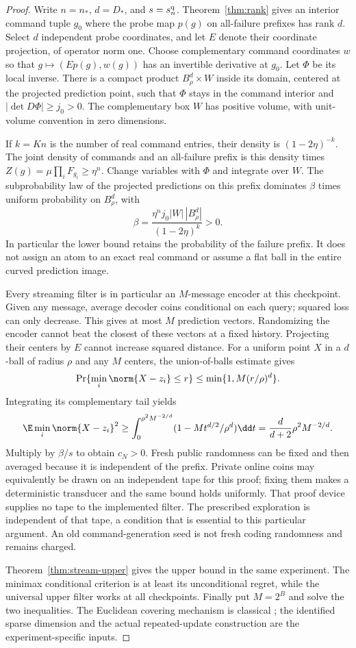\begin{proof}
Write $n=n_*$, $d=D_*$, and $s=s_n^{\rm q}$. Theorem~\ref{thm:rank}
gives an interior command tuple $g_0$ where the probe map $p(g)$ on
all-failure prefixes has rank $d$. Select $d$ independent probe coordinates,
and let $E$ denote their coordinate projection, of operator norm one.
Choose complementary command coordinates $w$ so that
$g\mapsto(Ep(g),w(g))$ has an invertible derivative at $g_0$.
Let $\Phi$ be its local inverse. There is a compact product
$B_\rho^d\times W$ inside its domain, centered at the projected
prediction point, such that $\Phi$ stays in the command interior and
$|\det D\Phi|\ge j_0>0$. The complementary box $W$ has positive
volume, with unit-volume convention in zero dimensions.

If $k=Kn$ is the number of real command entries, their density is
$(1-2\eta)^{-k}$. The joint density of commands and an all-failure
prefix is this density times
$Z(g)=\mu\prod_iF_{g_i}\ge\eta^n$. Change variables with $\Phi$ and
integrate over $W$. The subprobability law of the projected predictions
on this prefix dominates $\beta$ times uniform probability on
$B_\rho^d$, with
\[
 \beta=\frac{\eta^n j_0|W|\,|B_\rho^d|}{(1-2\eta)^k}>0.
\]
In particular the lower bound retains the probability of the failure
prefix. It does not assign an atom to an exact real command or assume
a flat ball in the entire curved prediction image.

Every streaming filter is in particular an $M$-message encoder at this
checkpoint. Given any message, average decoder coins conditional on each
query; squared loss can only decrease. This gives at most $M$ prediction
vectors. Randomizing the encoder cannot beat the closest of these vectors
at a fixed history. Projecting their centers by $E$ cannot increase squared
distance. For a uniform point $X$ in a $d$-ball of radius $\rho$ and any
$M$ centers, the union-of-balls estimate gives
\[
 \Pr\{\min_i\norm{X-z_i}\le r\}\le
                    \min\{1,M(r/\rho)^d\}.
\]
Integrating its complementary tail yields
\[
 \E\min_i\norm{X-z_i}^2
 \ge\int_0^{\rho^2 M^{-2/d}}
          (1-Mt^{d/2}/\rho^d)\dd t
 =\frac d{d+2}\rho^2 M^{-2/d}.
\]
Multiply by $\beta/s$ to obtain $c_N>0$. Fresh public randomness can be
fixed and then averaged because it is independent of the prefix. Private
online coins may equivalently be drawn on an independent tape for this
proof; fixing them makes a deterministic transducer and the same bound
holds uniformly. That proof device supplies no tape to the implemented
filter. The prescribed exploration is independent of that tape, a condition
that is essential to this particular argument. An old command-generation
seed is not fresh coding randomness and remains charged.

Theorem~\ref{thm:stream-upper} gives the upper bound in the same experiment.
The minimax conditional criterion is at least its unconditional regret,
while the universal upper filter works at all checkpoints. Finally put
$M=2^B$ and solve the two inequalities. The Euclidean covering mechanism
is classical \cite{GrafLuschgy}; the identified sparse dimension and the
actual repeated-update construction are the experiment-specific inputs.
\end{proof}

